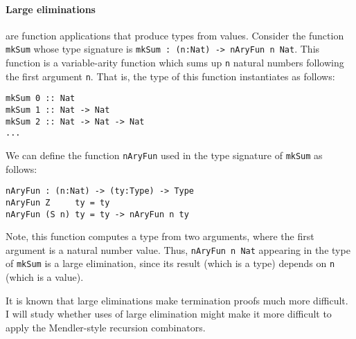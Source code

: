 \documentclass[letterpaper,12pt]{article}
\begin{document}
\paragraph{Large eliminations} are function applications that produce types
from values.  Consider the function \verb|mkSum| whose type signature is
\texttt{mkSum : (n:Nat) -> nAryFun n Nat}.  This function is a variable-arity
function which sums up \verb|n| natural numbers following the first argument
\verb|n|.  That is, the type of this function instantiates as follows:
\begin{verbatim}
mkSum 0 :: Nat
mkSum 1 :: Nat -> Nat
mkSum 2 :: Nat -> Nat -> Nat
...
\end{verbatim}
We can define the function \verb|nAryFun| used in the type signature of
\verb|mkSum| as follows:
\begin{verbatim}
nAryFun : (n:Nat) -> (ty:Type) -> Type
nAryFun Z     ty = ty
nAryFun (S n) ty = ty -> nAryFun n ty 
\end{verbatim}
Note, this function computes a type from two arguments,
where the first argument is a natural number value.
Thus, \texttt{nAryFun n Nat} appearing in the type of \verb|mkSum|
is a large elimination, since its result (which is a type) depends
on \verb|n| (which is a value).

It is known that large eliminations make termination proofs much more difficult.
I will study whether uses of large elimination might make it more difficult
to apply the Mendler-style recursion combinators.




\end{document}
